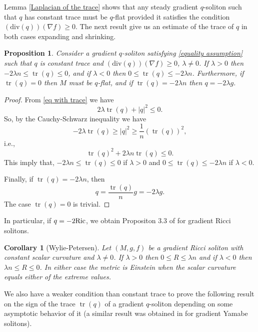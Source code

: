 \documentclass{amsart}
\theoremstyle{plain}
\newtheorem{corollary}[theorem]{\bf Corollary}
\newtheorem{proposition}[theorem]{\bf Proposition}
\numberwithin{equation}{section}
\begin{document}
 Lemma \ref{Laplacian of the trace} shows that any steady gradient $q$-soliton such that $q$ has constant trace must be $q$-flat provided it satisfies the condition $(\mathrm{div}(q))(\nabla f) \geq0$. The next result give us an estimate of the trace of $q$ in both cases expanding and shrinking.

 \begin{proposition}\label{Prop01}
 Consider a gradient $q$-soliton satisfying   
 \eqref{equality assumption}  such that $q$ is constant trace and  $(\mathrm{div}(q))(\nabla f) \geq0$, $\lambda\not=0$. If $\lambda>0$ then $-2\lambda n\leq \operatorname{tr}(q)\leq0$, and if $\lambda<0$ then $0\leq \operatorname{tr}(q)\leq-2\lambda n$. Furthermore, if $\operatorname{tr}(q)=0$ then $M$ must be $q$-flat, and if $\operatorname{tr}(q)=-2\lambda n$ then $q=-2\lambda g$.
 \end{proposition}
 \begin{proof}
 From \eqref{eq with trace} we have
     $$2\lambda\operatorname{tr}(q)+|q|^2\leq0.$$
 So, by the Cauchy-Schwarz inequality
 we have 
 $$-2\lambda\operatorname{tr}(q)\geq|q|^2\geq\frac{1}{n}(\operatorname{tr}(q))^2,$$
 i.e.,
 $$\operatorname{tr}(q)^2+2\lambda n\operatorname{tr}(q)\leq0.$$
This imply that, $-2\lambda n\leq \operatorname{tr}(q)\leq0$ if $\lambda>0$ and $0\leq \operatorname{tr}(q)\leq-2\lambda n$ if $\lambda<0$.

 Finally, if $\operatorname{tr}(q)=-2\lambda n$, then $$q=\frac{\operatorname{tr}(q)}{n}g=-2\lambda g.$$
 The case $\operatorname{tr}(q)=0$ is trivial.
 \end{proof}

 In particular, if $q=-2{\rm Ric}$, we obtain Propositon 3.3 of \cite{WP} for gradient Ricci solitons. 

\begin{corollary}[Wylie-Petersen]
 Let $(M,g,f)$ be a gradient Ricci soliton with constant scalar curvature and $\lambda\not=0$. If $\lambda>0$ then $0\leq R \leq\lambda n$ and if $\lambda<0$ then $\lambda n\leq R \leq0$. In either case the metric is Einstein when the scalar curvature equals either of the extreme values.
 \end{corollary}

 We also have a weaker condition than constant trace to prove the following result on the sign of the trace $\operatorname{tr}(q)$
of a gradient $q$-soliton depending on some asymptotic behavior of it (a similar result was obtained in \cite[Theorem 1]{ML} for gradient Yamabe solitons).
\end{document}
